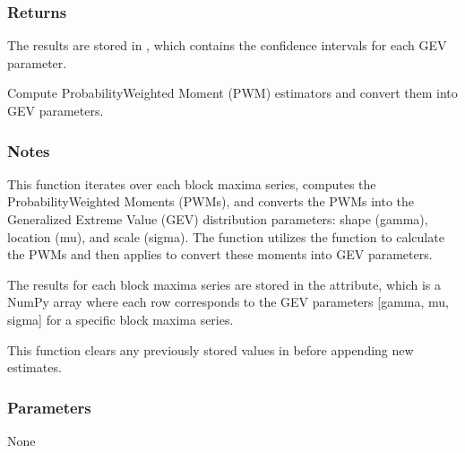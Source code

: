 \documentclass[a4paper,11pt,openany,english]{sphinxmanual}
\begin{document}
\begin{fulllineitems}
\begin{fulllineitems}
\subsubsection{Returns}
\label{\detokenize{api_topt:id31}}\begin{description}
\sphinxAtStartPar
The results are stored in , which contains the confidence intervals for each GEV parameter.

\end{description}

\end{fulllineitems}


\begin{fulllineitems}
\label{\detokenize{api_topt:xtremes.topt.PWM_estimators.get_PWM_estimation}}
\pysigstartsignatures
{}
\pysigstopsignatures
\sphinxAtStartPar
Compute Probability\sphinxhyphen{}Weighted Moment (PWM) estimators and convert them into GEV parameters.


\subsubsection{Notes}
\label{\detokenize{api_topt:id32}}
\sphinxAtStartPar
This function iterates over each block maxima series, computes the Probability\sphinxhyphen{}Weighted Moments (PWMs), and converts the PWMs into the 
Generalized Extreme Value (GEV) distribution parameters: shape (gamma), location (mu), and scale (sigma). The function utilizes the 
 function to calculate the PWMs and then applies  to convert these moments into GEV parameters.

\sphinxAtStartPar
The results for each block maxima series are stored in the  attribute, which is a NumPy array where each row corresponds to 
the GEV parameters {[}gamma, mu, sigma{]} for a specific block maxima series.

\sphinxAtStartPar
This function clears any previously stored values in  before appending new estimates.


\subsubsection{Parameters}
\label{\detokenize{api_topt:id33}}
\sphinxAtStartPar
None



\end{fulllineitems}
\end{fulllineitems}
\end{document}
